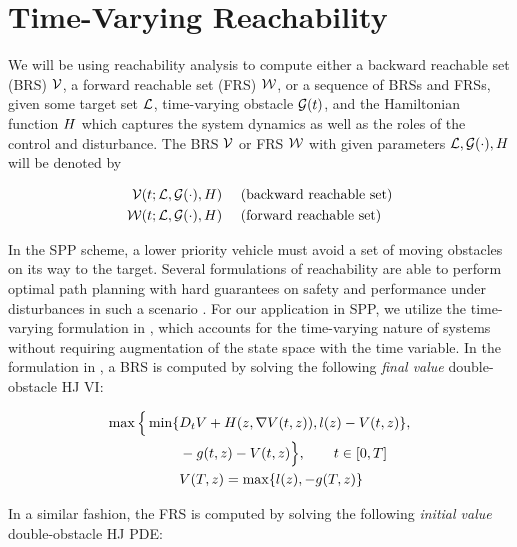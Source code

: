\section{Time-Varying Reachability \label{sec:HJIVI}}
We will be using reachability analysis to compute either a backward reachable set (BRS) $\mathcal{V}$, a forward reachable set (FRS) $\mathcal{W}$, or a sequence of BRSs and FRSs, given some target set $\mathcal{L}$, time-varying obstacle $\mathcal{G}(t)$, and the Hamiltonian function $H$ which captures the system dynamics as well as the roles of the control and disturbance. The BRS $\mathcal{V}$ or FRS $\mathcal{W}$ with given parameters $\mathcal{L}, \mathcal{G}(\cdot), H$ will be denoted by

\begin{equation}
\begin{aligned}
\mathcal{V}(t; \mathcal{L}, \mathcal{G}(\cdot), H) &\quad \text{ (backward reachable set)}\\
\mathcal{W}(t; \mathcal{L}, \mathcal{G}(\cdot), H) &\quad \text{ (forward reachable set)}
\end{aligned}
\end{equation}

In the SPP scheme, a lower priority vehicle must avoid a set of moving obstacles on its way to the target. Several formulations of reachability are able to perform optimal path planning with hard guarantees on safety and performance under disturbances in such a scenario \cite{}. For our application in SPP, we utilize the time-varying formulation in \cite{}, which accounts for the time-varying nature of systems without requiring augmentation of the state space with the time variable. In the formulation in \cite{}, a BRS is computed by solving the following \textit{final value} double-obstacle HJ VI:

\begin{equation}
\label{eq:HJIVI_BRS}
\begin{aligned}
\max \Big\{ \min \{&D_t \valfunc + \ham(\state, \nabla \valfunc(t, \state)), \fc(\state) - \valfunc(t, \state) \}, \\
&-\obsfunc(t, \state) - \valfunc(t, \state) \Big\}, \qquad t \in [0, T] \\
&\valfunc(T, \state) = \max\{\fc(\state), -\obsfunc(T, \state)\}
\end{aligned}
\end{equation}

In a similar fashion, the FRS is computed by solving the following \textit{initial value} double-obstacle HJ PDE:

